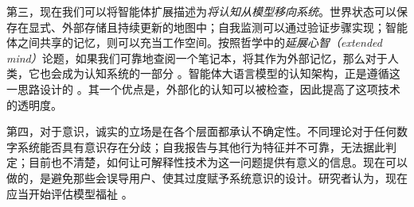 第三，现在我们可以将智能体扩展描述为\emph{将认知从模型移向系统}。世界状态可以保存在显式、外部存储且持续更新的地图中；自我监测可以通过验证步骤实现；智能体之间共享的记忆，则可以充当工作空间。按照哲学中的\emph{延展心智（extended mind）}论题，如果我们可靠地查阅一个笔记本，将其作为外部记忆，那么对于人类，它也会成为认知系统的一部分 \citep{clark1998extended}。智能体大语言模型的认知架构，正是遵循这一思路设计的 \citep{sumers2024cognarch}。其一个优点是，外部化的认知可以被检查，因此提高了这项技术的透明度。

第四，对于意识，诚实的立场是在各个层面都承认不确定性。不同理论对于任何数字系统能否具有意识存在分歧；自我报告与其他行为特征并不可靠，无法据此判定；目前也不清楚，如何让可解释性技术为这一问题提供有意义的信息。现在可以做的，是避免那些会误导用户、使其过度赋予系统意识的设计。研究者认为，现在应当开始评估模型福祉 \citep{butlin2023consciousness,long2024taking}。





